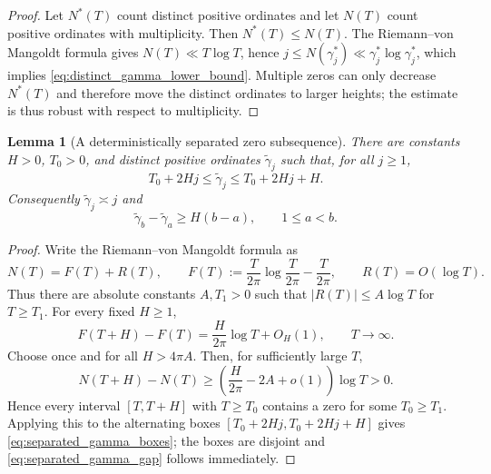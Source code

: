 \documentclass[11pt]{amsart}
\numberwithin{equation}{section}
\theoremstyle{plain}
\newtheorem{lemma}[theorem]{Lemma}
\theoremstyle{definition}
\theoremstyle{remark}
\begin{document}
\begin{proof}
Let $N^*(T)$ count distinct positive ordinates and let $N(T)$ count positive ordinates with multiplicity. Then $N^*(T)\le N(T)$. The Riemann--von Mangoldt formula gives $N(T)\ll T\log T$, hence
$j\le N(\gamma_j^*)\ll \gamma_j^*\log\gamma_j^*$, which implies \eqref{eq:distinct_gamma_lower_bound}. Multiple zeros can only decrease $N^*(T)$ and therefore move the distinct ordinates to larger heights; the estimate is thus robust with respect to multiplicity.
\end{proof}

\begin{lemma}[A deterministically separated zero subsequence]
\label{lem:separated_zero_subsequence}
There are constants $H>0$, $T_0>0$, and distinct positive ordinates $\widetilde\gamma_j$ such that, for all $j\ge1$,
\begin{equation}
T_0+2Hj\le \widetilde\gamma_j\le T_0+2Hj+H.
\label{eq:separated_gamma_boxes}
\end{equation}
Consequently $\widetilde\gamma_j\asymp j$ and
\begin{equation}
\widetilde\gamma_b-\widetilde\gamma_a\ge H(b-a),
\qquad 1\le a<b.
\label{eq:separated_gamma_gap}
\end{equation}
\end{lemma}

\begin{proof}
Write the Riemann--von Mangoldt formula as
\begin{equation}
N(T)=F(T)+R(T),
\qquad
F(T):=\frac{T}{2\pi}\log\frac{T}{2\pi}-\frac{T}{2\pi},
\qquad
R(T)=O(\log T).
\label{eq:RVM_for_boxes}
\end{equation}
Thus there are absolute constants $A,T_1>0$ such that $|R(T)|\le A\log T$ for $T\ge T_1$. For every fixed $H\ge1$,
\begin{equation}
F(T+H)-F(T)=\frac{H}{2\pi}\log T+O_H(1),
\qquad T\to\infty.
\label{eq:RVM_short_fixed_interval}
\end{equation}
Choose once and for all $H>4\pi A$. Then, for sufficiently large $T$,
\[
N(T+H)-N(T)
\ge
\left(\frac{H}{2\pi}-2A+o(1)\right)\log T>0.
\]
Hence every interval $[T,T+H]$ with $T\ge T_0$ contains a zero for some $T_0\ge T_1$. Applying this to the alternating boxes $[T_0+2Hj,T_0+2Hj+H]$ gives \eqref{eq:separated_gamma_boxes}; the boxes are disjoint and \eqref{eq:separated_gamma_gap} follows immediately.
\end{proof}
\end{document}

